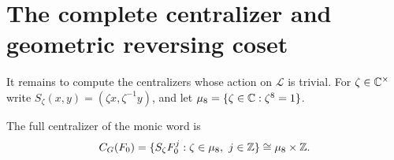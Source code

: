 \section{The complete centralizer and geometric reversing coset}
\label{sec:centralizer}

It remains to compute the centralizers whose action on $\mathcal L$
is trivial. For $\zeta\in\mathbb C^\times$ write
$S_\zeta(x,y)=(\zeta x,\zeta^{-1}y)$, and let
$\mu_8=\{\zeta\in\mathbb C:\zeta^8=1\}$.

\begin{proposition}\label{prop:centralizer}
The full centralizer of the monic word is
\begin{equation}\label{eq:full-centralizer}
  C_G(F_0)=\{S_\zeta F_0^j:\zeta\in\mu_8,\ j\in\mathbb Z\}
          \cong\mu_8\times\mathbb Z.
\end{equation}
\end{proposition}

